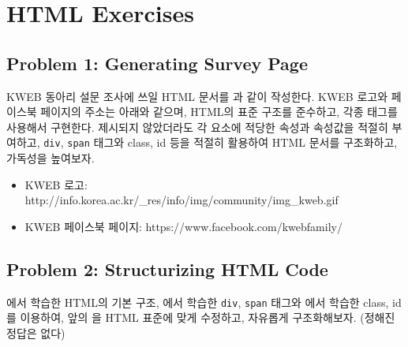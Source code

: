 \section{HTML Exercises} \label{sect:html-exercises}

\subsection*{Problem 1: Generating Survey Page}

KWEB 동아리 설문 조사에 쓰일 HTML 문서를 과 같이 작성한다. KWEB 로고와 페이스북 페이지의 주소는 아래와 같으며, HTML의 표준 구조를 준수하고, 각종 태그를 사용해서 구현한다. 제시되지 않았더라도 각 요소에 적당한 속성과 속성값을 적절히 부여하고, \texttt{div}, \texttt{span} 태그와 class, id 등을 적절히 활용하여 HTML 문서를 구조화하고, 가독성을 높여보자.

\begin{itemize}
    \item KWEB 로고: http://info.korea.ac.kr/\_res/info/img/community/img\_kweb.gif
    \item KWEB 페이스북 페이지: https://www.facebook.com/kwebfamily/
\end{itemize}

    {}

\subsection*{Problem 2: Structurizing HTML Code}

에서 학습한 HTML의 기본 구조, 에서 학습한 \texttt{div}, \texttt{span} 태그와 에서 학습한 class, id를 이용하여, 앞의 을 HTML 표준에 맞게 수정하고, 자유롭게 구조화해보자. (정해진 정답은 없다) 
